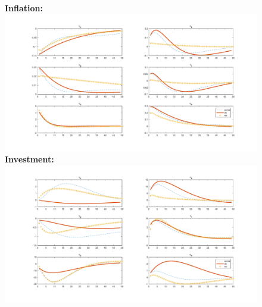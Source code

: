 \documentclass[12pt,reqno]{article}
\numberwithin{equation}{section}
\begin{document}
\begin{figure}[H]
\textbf{Inflation:}\\
\includegraphics[scale=0.5]{MSV_impresp_pinf_reeComp.pdf}
\textbf{Investment:}\\
\includegraphics[scale=0.5]{MSV_impresp_inve_reeComp.pdf}
\end{figure}
\end{document}
